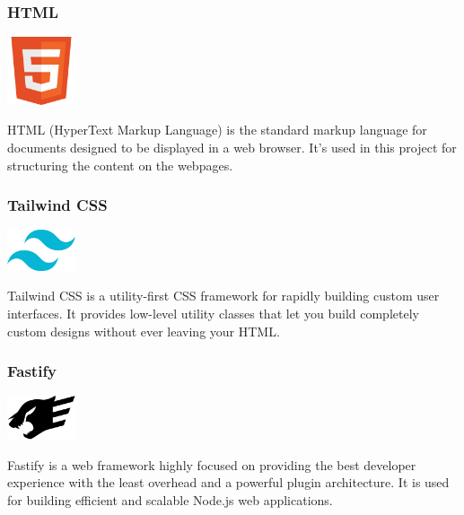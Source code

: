 \subsubsection{HTML}

\begin{center}
\includegraphics[width=0.15\textwidth]{Images/logos/html.png}
\label{fig:html}
\end{center}
HTML (HyperText Markup Language) is the standard markup language for documents designed to be displayed in a web browser. It’s used in this project for structuring the content on the webpages.

\subsubsection{Tailwind CSS}

\begin{center}
\includegraphics[width=0.15\textwidth]{Images/logos/tailwind.png}
\label{fig:tailwind}
\end{center}
Tailwind CSS is a utility-first CSS framework for rapidly building custom user interfaces. It provides low-level utility classes that let you build completely custom designs without ever leaving your HTML.

\subsubsection{Fastify}

\begin{center}
\includegraphics[width=0.15\textwidth]{Images/logos/fastify.png}
\label{fig:fastify}
\end{center}
Fastify is a web framework highly focused on providing the best developer experience with the least overhead and a powerful plugin architecture. It is used for building efficient and scalable Node.js web applications.

